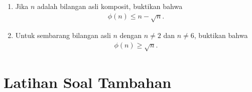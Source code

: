 \documentclass[11pt]{scrartcl}
\begin{document}
\begin{enumerate}[resume]
    \item Jika $n$ adalah bilangan asli komposit, buktikan bahwa
    \begin{align*}
        \phi(n) \le n - \sqrt{n}.
    \end{align*}

    \item Untuk sembarang bilangan asli $n$ dengan $n \neq 2$ dan $n \neq 6$, buktikan bahwa
    \begin{align*}
        \phi(n) \ge \sqrt{n}.
    \end{align*}
\end{enumerate}

\section{Latihan Soal Tambahan}
\end{document}
